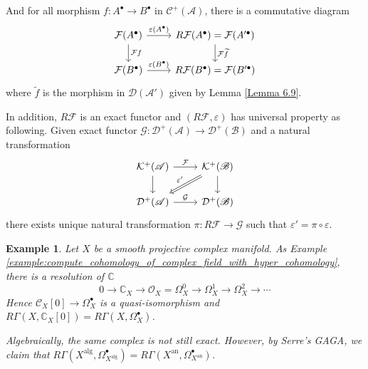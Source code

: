 \documentclass{ctexart}
\newtheorem{example}{Example}[section]
\newcommand{\analytification}{\operatorname{an}}
\begin{document}
And for all morphism $f: A^{\bullet} \rightarrow B^{\bullet}$ in $\mathcal{C}^{+}(\mathscr{A})$, there is a commutative diagram 
\begin{equation}
    \begin{tikzcd}
        \mathcal{F}(A^{\bullet}) \arrow[r, "\varepsilon(A^{\bullet})"] \arrow[d, "\mathcal{F}f"] &
        R\mathcal{F}(A^{\bullet}) = \mathcal{F}(A'^{\bullet}) \arrow[d, "\mathcal{F}\widetilde{f}"] \\
        \mathcal{F}(B^{\bullet}) \arrow[r, "\varepsilon(B^{\bullet})"] &
        R\mathcal{F}(B^{\bullet}) = \mathcal{F}(B'^{\bullet})
    \end{tikzcd}
\end{equation}
where $\widetilde{f}$ is the morphism in $\mathcal{D}(\mathscr{A}')$ given by Lemma \ref{Lemma 6.9}.
\par
In addition, $R\mathcal{F}$ is an exact functor and $(R\mathcal{F}, \varepsilon)$ has universal property as following.
Given exact functor $\mathcal{G}: \mathcal{D}^{+}(\mathscr{A}) \rightarrow \mathcal{D}^{+}(\mathscr{B})$ and a natural transformation
\begin{equation}
    \begin{tikzcd}
        \mathcal{K}^{+}(\mathscr{A}) \arrow[r, "\mathcal{F}"] \arrow[d] &
        \mathcal{K}^{+}(\mathscr{B}) \arrow[d] \arrow[dl, Rightarrow, "{\varepsilon'}" swap] \\
        \mathcal{D}^{+}(\mathscr{A}) \arrow[r, "\mathcal{G}"] &
        \mathcal{D}^{+}(\mathscr{B})
    \end{tikzcd}
\end{equation}
there exists unique natural transformation $\pi: R\mathcal{F} \rightarrow \mathcal{G}$ such that $\varepsilon' = \pi \circ \varepsilon$.
\begin{example}
    Let $X$ be a smooth projective complex manifold.
    As Example \ref{example:compute_cohomology_of_complex_field_with_hyper_cohomology}, there is a resolution of $\mathbb{C}$
    \begin{equation}
        0 \rightarrow \mathbb{C}_{X} \rightarrow \mathcal{O}_{X} = \Omega_{X}^{0} \rightarrow \Omega_{X}^{1} \rightarrow \Omega_{X}^{2} \rightarrow \cdots
    \end{equation}
    Hence $\mathcal{C}_{X}[0] \rightarrow \Omega_{X}^{\bullet}$ is a quasi-isomorphism and $R\Gamma(X, \mathbb{C}_{X}[0]) = R\Gamma(X, \Omega_{X}^{\bullet})$.
    \par
    Algebraically, the same complex is not still exact.
    However, by Serre's GAGA, we claim that $R\Gamma(X^{\operatorname{alg}}, \Omega_{X^{\operatorname{alg}}}^{\bullet}) = R\Gamma(X^{\analytification}, \Omega_{X^{\analytification}}^{\bullet})$.
\end{example}
\end{document}
